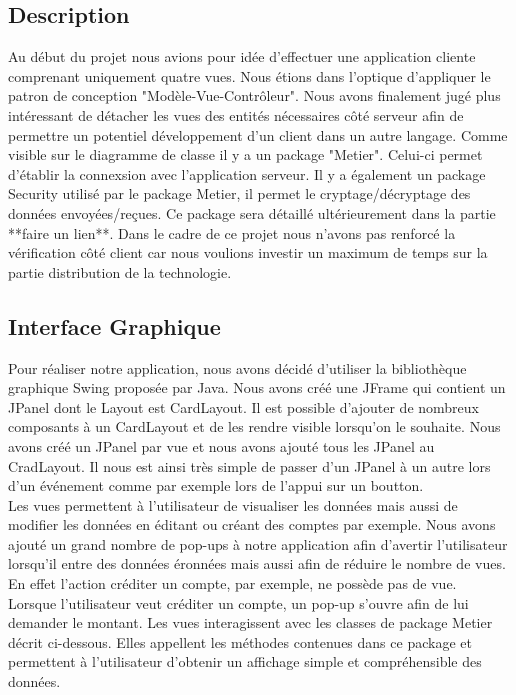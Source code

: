 \subsection{Description}

Au début du projet nous avions pour idée d'effectuer une application cliente comprenant uniquement quatre vues. 
Nous étions dans l'optique d'appliquer le patron de conception "Modèle-Vue-Contrôleur".
Nous avons finalement jugé plus intéressant de détacher les vues des entités nécessaires côté serveur afin de permettre un potentiel développement d'un client dans un autre langage. 
\hline
Comme visible sur le diagramme de classe il y a un package "Metier".
Celui-ci permet d'établir la connexsion avec l'application serveur.
\hline
Il y a également un package Security utilisé par le package Metier, il permet le cryptage/décryptage des données envoyées/reçues.
Ce package sera détaillé ultérieurement dans la partie **faire un lien**.
Dans le cadre de ce projet nous n'avons pas renforcé la vérification côté client car nous voulions investir un maximum de temps sur la partie distribution de la technologie.

\subsection{Interface Graphique}

Pour réaliser notre application, nous avons décidé d'utiliser la bibliothèque graphique Swing proposée par Java. Nous avons créé une JFrame qui contient un JPanel dont le Layout est CardLayout. Il est possible d'ajouter de nombreux composants à un CardLayout et de les rendre visible lorsqu'on le souhaite.
 Nous avons créé un JPanel par vue et nous avons ajouté tous les JPanel au CradLayout. Il nous est ainsi très simple de passer d'un JPanel à un autre lors d'un événement comme par exemple lors de l'appui sur un boutton. \\
Les vues permettent à l'utilisateur de visualiser les données mais aussi de modifier les données en éditant ou créant des comptes par exemple. Nous avons ajouté un grand nombre de pop-ups à notre application afin d'avertir l'utilisateur lorsqu'il entre des données éronnées mais aussi afin de réduire le nombre de vues. En effet l'action créditer un compte, par exemple, ne possède pas de vue.\\ 
Lorsque l'utilisateur veut créditer un compte, un pop-up s'ouvre afin de lui demander le montant. Les vues interagissent avec les classes de package Metier décrit ci-dessous. Elles appellent les méthodes contenues dans ce package et permettent à l'utilisateur d'obtenir un affichage simple et compréhensible des données.


